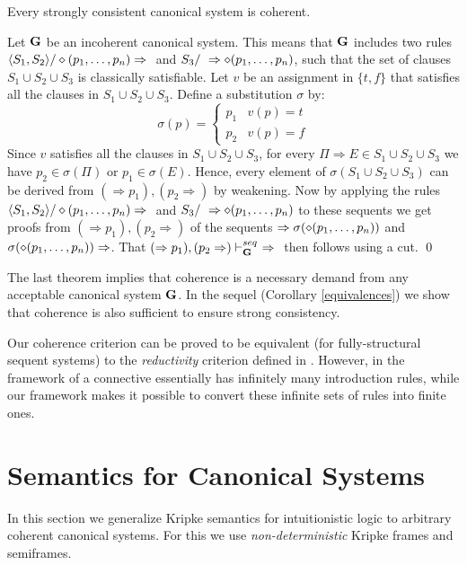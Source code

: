 \documentclass{LMCS}
\theoremstyle{remark}
\newcommand{\G}{{\bf G}}
\newcommand{\dd}{\diamond}
\newcommand{\ptil}{p_1 \til p_n}
\newcommand{\Ra}{\Rightarrow}
\newcommand{\vd}{\vdash}
\newcommand{\tup}[1]{\langle #1 \rangle}
\begin{document}
\begin{thm}
\label{strong consistency -> coherence}
Every strongly consistent canonical system is coherent.
\end{thm}
\proof
Let ${\G}$ be an incoherent canonical system.
This means that ${\G}$ includes two rules $\tup{S_1,S_2}/\dd(\ptil) \Ra \ $ and
$S_3/\ \Ra \dd(\ptil)$, such that the set of clauses
$S_1\cup S_2\cup S_3$ is classically satisfiable. Let $v$ be an assignment
in $\{t,f\}$ that satisfies all the clauses in $S_1\cup S_2\cup S_3$. 
Define a substitution $\sigma$ by:
\[\sigma(p)= \left\{
\begin{array}{ll}
p_1   & v(p)=t\\
p_2   & v(p)=f
\end{array}
\right.\] 
Since $v$ satisfies all the clauses in $S_1\cup S_2\cup S_3$,
for every ${\Pi\Ra E\in S_1\cup S_2\cup S_3}$ we have 
$p_2 \in \sigma(\Pi)$ or $p_1 \in \sigma(E)$.
Hence, every element of ${\sigma(S_1\cup S_2\cup S_3)}$ can be derived from ${(\Ra p_1),(p_2\Ra)}$ by weakening.
Now by applying the rules ${\tup{S_1,S_2}/\dd(\ptil) \Ra \ }$ and ${S_3/\ \Ra \dd(\ptil)}$ 
to these  sequents we get proofs from ${(\Ra p_1),(p_2\Ra)}$ of 
the sequents ${\Ra \sigma(\dd(\ptil))}$ and ${\sigma(\dd(\ptil))\Ra}$. 
That ${(\Ra p_1),(p_2\Ra)\vd_{\G}^{seq} \ \Ra \ }$ then follows using a cut.
\qed

\noindent
The last theorem implies that coherence is a necessary
demand from any acceptable canonical system ${\G}$. 
In the sequel (Corollary \ref{equivalences})
we show that coherence is also sufficient 
to ensure strong consistency.




\begin{rem}
Our coherence criterion can be proved to be equivalent (for fully-structural sequent systems) 
to the {\em reductivity} criterion defined in \cite{CT06}. 
However,  in the framework of \cite{CT06} a connective
essentially has infinitely many introduction rules,
while our framework makes it possible to convert
these infinite sets of rules into  finite ones. 
\end{rem}

\section{Semantics for Canonical Systems}
\label{semantic section}

In this section we generalize Kripke semantics for intuitionistic logic
to arbitrary coherent canonical systems. For this we
use {\em non-deterministic} Kripke frames and semiframes.
\end{document}
